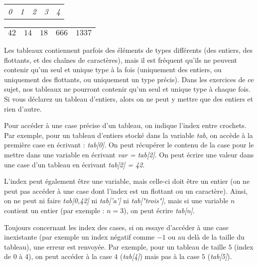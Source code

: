 \documentclass[11pt,a4paper]{article}
\begin{document}
\bigskip

\begin{table}[h!]
  \centering
  \begin{tabular}{ C{0.77cm}  C{0.77cm}  C{0.77cm}  C{0.77cm}  C{0.77cm} }
\textit{0} & \textit{1} & \textit{2} & \textit{3} & \textit{4} \\
  \end{tabular}

  \begin{tabular}{| C{0.77cm} | C{0.77cm} | C{0.77cm} | C{0.77cm} | C{0.77cm} |}
  \hline
$ 42 $ & $ 14 $ & $ 18 $ & $ 666 $ & $ 1337 $ \\
  \hline
  \end{tabular}
\end{table}
\bigskip

Les tableaux contiennent parfois des éléments de types différents (des entiers, des flottants, et des chaînes de caractères), mais il est fréquent qu'ils ne peuvent contenir qu'un seul et unique type à la fois (uniquement des entiers, ou uniquement des flottants, ou uniquement un type précis).
Dans les exercices de ce sujet, nos tableaux ne pourront contenir qu'un seul et unique type à chaque fois.
Si vous déclarez un tableau d'entiers, alors on ne peut y mettre que des entiers et rien d'autre.

\bigskip

Pour accéder à une case précise d'un tableau, on indique l'index entre crochets.
Par exemple, pour un tableau d'entiers stocké dans la variable \textit{tab}, on accède à la première case en écrivant : \textit{tab[0]}.
On peut récupérer le contenu de la case pour le mettre dans une variable en écrivant \textit{var = tab[2]}.
On peut écrire une valeur dans une case d'un tableau en écrivant \textit{tab[2] = 42}.

\bigskip

L'index peut également être une variable, mais celle-ci doit être un entier (on ne peut pas accéder à une case dont l'index est un flottant ou un caractère).
Ainsi, on ne peut ni faire \textit{tab[0,42]} ni \textit{tab['a']} ni \textit{tab["trois"]}, mais si une variable $ n $ contient un entier (par exemple : $ n = 3 $), on peut écrire \textit{tab[n]}.

\bigskip

Toujours concernant les index des cases, si on essaye d'accéder à une case inexistante (par exemple un index négatif comme $ -1 $ ou au delà de la taille du tableau), une erreur est renvoyée.
Par exemple, pour un tableau de taille $ 5 $ (index de 0 à 4), on peut accéder à la case $ 4 $ (\textit{tab[4]}) mais pas à la case $ 5 $ (\textit{tab[5]}).
\end{document}
